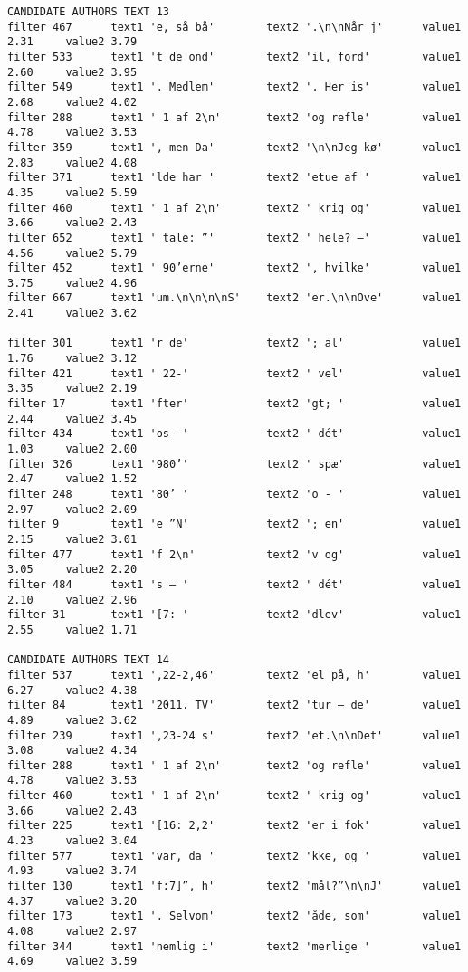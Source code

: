 {\begin{verbatim}
CANDIDATE AUTHORS TEXT 13
filter 467      text1 'e, så bå'        text2 '.\n\nNår j'      value1 2.31     value2 3.79
filter 533      text1 't de ond'        text2 'il, ford'        value1 2.60     value2 3.95
filter 549      text1 '. Medlem'        text2 '. Her is'        value1 2.68     value2 4.02
filter 288      text1 ' 1 af 2\n'       text2 'og refle'        value1 4.78     value2 3.53
filter 359      text1 ', men Da'        text2 '\n\nJeg kø'      value1 2.83     value2 4.08
filter 371      text1 'lde har '        text2 'etue af '        value1 4.35     value2 5.59
filter 460      text1 ' 1 af 2\n'       text2 ' krig og'        value1 3.66     value2 2.43
filter 652      text1 ' tale: ”'        text2 ' hele? –'        value1 4.56     value2 5.79
filter 452      text1 ' 90’erne'        text2 ', hvilke'        value1 3.75     value2 4.96
filter 667      text1 'um.\n\n\n\nS'    text2 'er.\n\nOve'      value1 2.41     value2 3.62

filter 301      text1 'r de'            text2 '; al'            value1 1.76     value2 3.12
filter 421      text1 ' 22-'            text2 ' vel'            value1 3.35     value2 2.19
filter 17       text1 'fter'            text2 'gt; '            value1 2.44     value2 3.45
filter 434      text1 'os –'            text2 ' dét'            value1 1.03     value2 2.00
filter 326      text1 '980’'            text2 ' spæ'            value1 2.47     value2 1.52
filter 248      text1 '80’ '            text2 'o - '            value1 2.97     value2 2.09
filter 9        text1 'e ”N'            text2 '; en'            value1 2.15     value2 3.01
filter 477      text1 'f 2\n'           text2 'v og'            value1 3.05     value2 2.20
filter 484      text1 's – '            text2 ' dét'            value1 2.10     value2 2.96
filter 31       text1 '[7: '            text2 'dlev'            value1 2.55     value2 1.71

CANDIDATE AUTHORS TEXT 14
filter 537      text1 ',22-2,46'        text2 'el på, h'        value1 6.27     value2 4.38
filter 84       text1 '2011. TV'        text2 'tur – de'        value1 4.89     value2 3.62
filter 239      text1 ',23-24 s'        text2 'et.\n\nDet'      value1 3.08     value2 4.34
filter 288      text1 ' 1 af 2\n'       text2 'og refle'        value1 4.78     value2 3.53
filter 460      text1 ' 1 af 2\n'       text2 ' krig og'        value1 3.66     value2 2.43
filter 225      text1 '[16: 2,2'        text2 'er i fok'        value1 4.23     value2 3.04
filter 577      text1 'var, da '        text2 'kke, og '        value1 4.93     value2 3.74
filter 130      text1 'f:7]”, h'        text2 'mål?”\n\nJ'      value1 4.37     value2 3.20
filter 173      text1 '. Selvom'        text2 'åde, som'        value1 4.08     value2 2.97
filter 344      text1 'nemlig i'        text2 'merlige '        value1 4.69     value2 3.59


\end{verbatim}}
